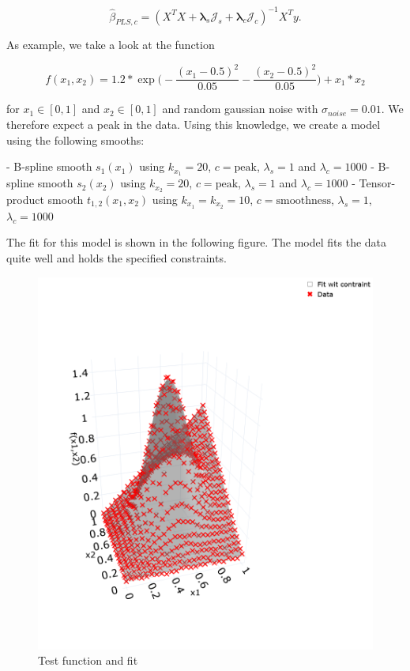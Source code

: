 \documentclass[10pt,a4paper]{article}
\begin{document}
	$$\hat \beta_{PLS,c} = (X^TX + \boldsymbol \lambda_s \mathcal J_s  + \boldsymbol \lambda_c \mathcal J_c)^{-1} X^T y.$$
	
	As example, we take a look at the function 
	
	$$f(x_1, x_2) = 1.2*\exp{\big(-\frac{(x_1 - 0.5)^2}{0.05} - \frac{(x_2 - 0.5)^2}{0.05}\big)} + x_1*x_2$$
	
	for $x_1 \in [0,1]$ and $x_2 \in [0,1]$ and random gaussian noise with $\sigma_{noise} = 0.01$. We therefore expect a peak in the data. Using this knowledge, we create a model using the following smooths:
	
	- B-spline smooth $s_1(x_1)$ using $k_{x_1} = 20$, $c = \text{peak}$, $\lambda_s = 1$ and $\lambda_c = 1000$
	- B-spline smooth $s_2(x_2)$ using $k_{x_2} = 20$, $c = \text{peak}$, $\lambda_s = 1$ and $\lambda_c = 1000$
	- Tensor-product smooth $t_{1,2}(x_1, x_2)$ using $k_{x_1} = k_{x_2} = 10$, $c = \text{smoothness}$, $\lambda_s = 1$, $\lambda_c = 1000$
	
	The fit for this model is shown in the following figure. The model fits the data quite well and holds the specified constraints.
	
		
	\begin{figure}[H]
		\centering
		\includegraphics[width=\linewidth]{thesisplots/2d_function.png}
		\caption{Test function and fit}
		\label{fig:2dtestf}
	\end{figure}
\end{document}
